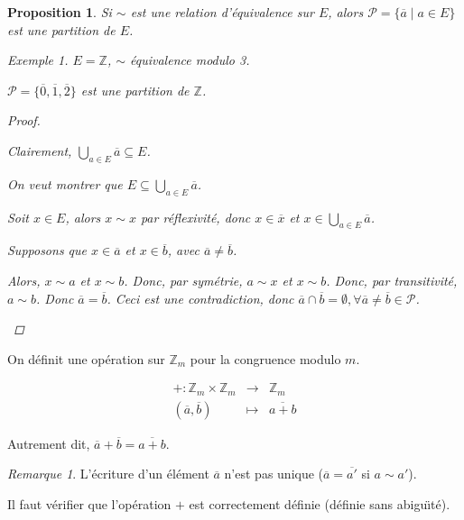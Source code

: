 \documentclass{report}
\newcommand*{\entiers}{\mathbb{Z}}
\newtheorem*{prop}{Proposition}
\theoremstyle{definition}
\theoremstyle{remark}
\newtheorem*{exem}{Exemple}
\newtheorem*{rema}{Remarque}
\begin{document}
	\begin{prop}
		Si $\sim$ est une relation d'\'equivalence sur $E$, alors $\mathcal{P} = \{\overline{a} \mid a \in E\}$ est une partition de $E$.
		\begin{exem}
			$E = \entiers$, $\sim$ \'equivalence modulo 3.

			$\mathcal{P} = \{\overline{0}, \overline{1}, \overline{2}\}$ est une partition de $\entiers$.
		\end{exem}
		\begin{proof}~

			\begin{nlist}
				\item Clairement, $\bigcup\limits_{a \in E}\overline{a} \subseteq E$.

				On veut montrer que $E \subseteq \bigcup\limits_{a \in E}\overline{a}$.

				Soit $x \in E$, alors $x \sim x$ par r\'eflexivit\'e, donc $x \in \overline{x}$ et $x \in \bigcup\limits_{a \in E}\overline{a}$.
				\item Supposons que $x \in \overline{a}$ et $x \in \overline{b}$, avec $\overline{a} \neq \overline{b}$.

				Alors, $x \sim a$ et $x \sim b$. Donc, par sym\'etrie, $a \sim x$ et $x \sim b$. Donc, par transitivit\'e, $a \sim b$. Donc $\overline{a} = \overline{b}$. Ceci est une contradiction, donc $\overline{a} \cap \overline{b} = \emptyset, \forall \overline{a} \neq \overline{b} \in \mathcal{P}$.
			\end{nlist}
		\end{proof}
	\end{prop}

	On d\'efinit une op\'eration sur $\entiers_m$ pour la congruence modulo $m$.

	\[
	\begin{array}{rcl}
		+:\entiers_m \times \entiers_m& \to& \entiers_m\\
		(\overline{a}, \overline{b})& \mapsto& \overline{a+b}
	\end{array}
	\]

	Autrement dit, $\overline{a} + \overline{b} = \overline{a+b}$.
	\begin{rema}
		L'\'ecriture d'un \'el\'ement $\overline{a}$ n'est pas unique ($\overline{a} = \overline{a'}$ si $a \sim a'$).
	\end{rema}

	Il faut v\'erifier que l'op\'eration $+$ est correctement d\'efinie (d\'efinie sans abigu\"\i t\'e).
\end{document}
